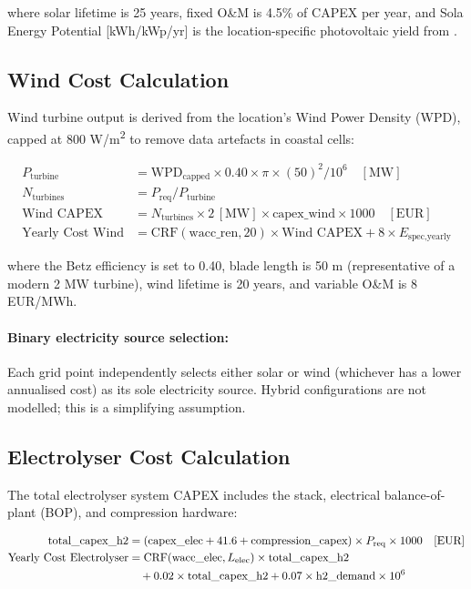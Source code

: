 where solar lifetime is 25 years, fixed O\&M is 4.5\% of CAPEX per year, and Sola Energy Potential [kWh/kWp/yr] is the location-specific photovoltaic yield from \cite{GSA}.

\subsection{Wind Cost Calculation}

Wind turbine output is derived from the location's Wind Power Density (WPD), capped at 800 W/m\textsuperscript{2} to remove data artefacts in coastal cells:

\begin{align}
    P_{\text{turbine}} &= \text{WPD}_{\text{capped}} \times 0.40 \times \pi \times (50)^2 / 10^6 \quad [\text{MW}] \\
    N_{\text{turbines}} &= P_{\text{req}} / P_{\text{turbine}} \\
    \text{Wind CAPEX} &= N_{\text{turbines}} \times 2\,[\text{MW}] \times \text{capex\_wind} \times 1000 \quad [\text{EUR}] \\
    \text{Yearly Cost Wind} &= \text{CRF}(\text{wacc\_ren}, 20) \times \text{Wind CAPEX} + 8 \times E_{\text{spec,yearly}}
\end{align}

where the Betz efficiency is set to 0.40, blade length is 50 m (representative of a modern 2 MW turbine), wind lifetime is 20 years, and variable O\&M is 8 EUR/MWh.

\paragraph{Binary electricity source selection:} Each grid point independently selects either solar or wind (whichever has a lower annualised cost) as its sole electricity source. Hybrid configurations are not modelled; this is a simplifying assumption.

\subsection{Electrolyser Cost Calculation}

The total electrolyser system CAPEX includes the stack, electrical balance-of-plant (BOP), and compression hardware:

\begin{align}
    \text{total\_capex\_h2} &= (\text{capex\_elec} + 41.6 + \text{compression\_capex}) \times P_{\text{req}} \times 1000 \quad [\text{EUR}] \\
    \text{Yearly Cost Electrolyser} &= \text{CRF}(\text{wacc\_elec}, L_{\text{elec}}) \times \text{total\_capex\_h2} \notag \\
    & \quad + 0.02 \times \text{total\_capex\_h2} + 0.07 \times \text{h2\_demand} \times 10^6
\end{align}

